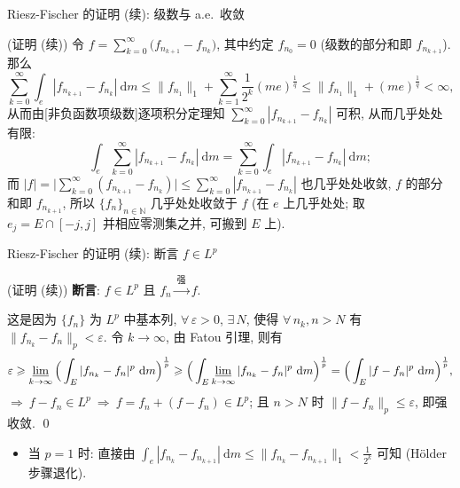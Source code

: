 
\begin{frame}{Riesz-Fischer 的证明 (续): 级数与 a.e.\ 收敛}

\startproof[bg=yellow, fg=red](证明 (续))
令 $f = \sum\limits_{k=0}^{\infty} \big( f_{n_{k+1}} - f_{n_k} \big)$,
其中约定 $f_{n_0} = 0$ (级数的部分和即 $f_{n_{k+1}}$). 那么
\[
\sum_{k=0}^{\infty} \int_e |f_{n_{k+1}} - f_{n_k}| ~ \mathrm{d} m
\leqslant \lVert f_{n_1} \rVert_1 + \sum_{k=1}^{\infty} \frac{1}{2^k} (m e)^{\frac1q}
\leqslant \lVert f_{n_1} \rVert_1 + (m e)^{\frac1q} < \infty ,
\]
从而由[非负函数项级数]逐项积分定理知
$\sum\limits_{k=0}^{\infty} |f_{n_{k+1}} - f_{n_k}|$ 可积, 从而几乎处处有限:
\[
\int_e \sum_{k=0}^{\infty} |f_{n_{k+1}} - f_{n_k}| ~ \mathrm{d} m
= \sum_{k=0}^{\infty} \int_e |f_{n_{k+1}} - f_{n_k}| ~ \mathrm{d} m ;
\]
而 $|f| = \Big| \sum\limits_{k=0}^{\infty} (f_{n_{k+1}} - f_{n_k}) \Big|
\leqslant \sum\limits_{k=0}^{\infty} |f_{n_{k+1}} - f_{n_k}|$ 也几乎处处收敛,
$f$ 的部分和即 $f_{n_{k+1}}$, 所以 $\{ f_n \}_{n \in \mathbb{N}}$
\alert{几乎处处收敛于} $f$ (在 $e$ 上几乎处处; 取 $e_j = E \cap [-j, j]$
并相应零测集之并, 可搬到 $E$ 上).

\end{frame}


\begin{frame}{Riesz-Fischer 的证明 (续): 断言 $f \in L^p$}

\startproof[bg=yellow, fg=red](证明 (续))
\textbf{断言}: $f \in L^p$ 且 $f_n \xrightarrow{\ \text{强}\ } f$.

这是因为 $\{ f_n \}$ 为 $L^p$ 中基本列, $\forall\, \varepsilon > 0$, $\exists\, N$,
使得 $\forall\, n_k, n > N$ 有 $\lVert f_{n_k} - f_n \rVert_p < \varepsilon$.
令 $k \to \infty$, 由 Fatou 引理, 则有
\[
\varepsilon
\geqslant \varliminf_{k \to \infty} \Big( \int_E |f_{n_k} - f_n|^p ~ \mathrm{d} m \Big)^{\frac1p}
\geqslant \Big( \int_E \varliminf_{k \to \infty} |f_{n_k} - f_n|^p ~ \mathrm{d} m \Big)^{\frac1p}
= \Big( \int_E |f - f_n|^p ~ \mathrm{d} m \Big)^{\frac1p} ,
\]
$\Longrightarrow\ f - f_n \in L^p\ \Longrightarrow\ f = f_n + (f - f_n) \in L^p$;
且 $n > N$ 时 $\lVert f - f_n \rVert_p \leqslant \varepsilon$, 即强收敛.
\qed

\pause

\begin{itemize}
\item 当 $p = 1$ 时: 直接由
  $\int_e |f_{n_k} - f_{n_{k+1}}| ~ \mathrm{d} m
  \leqslant \lVert f_{n_k} - f_{n_{k+1}} \rVert_1 < \frac{1}{2^k}$ 可知
  (Hölder 步骤退化).
\end{itemize}

\end{frame}

